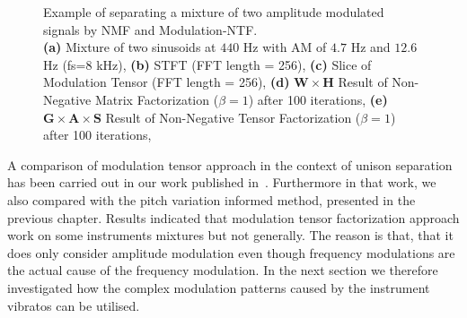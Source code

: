 \begin{figure}[H]
    \centering
    \tiny
    \hfill
    \subfloat[Spectrogram]{
    }%
    \hfill

    \subfloat[NMF]{
    }\hfill
    \hfill
    \caption{Example of separating a mixture of two amplitude modulated signals by NMF and Modulation-NTF. \\ \textbf{(a)} Mixture of two sinusoids at $440$ Hz with AM of $4.7$ Hz and $12.6$ Hz (fs=$8$ kHz), \textbf{(b)} STFT (FFT length = 256), \textbf{(c)} Slice of Modulation Tensor (FFT length = 256),  \textbf{(d)} $\mathbf{W} \times \mathbf{H}$ Result of Non-Negative Matrix Factorization ($\beta = 1$) after 100 iterations, \textbf{(e)}  $\mathbf{G} \times \mathbf{A} \times \mathbf{S} $ Result of Non-Negative Tensor Factorization ($\beta = 1$) after 100 iterations,}
    \label{fig:am_tensor}
\end{figure}

A comparison of modulation tensor approach in the context of unison separation has been carried out in our work published in~\cite{stoeter14}.
Furthermore in that work, we also compared with the pitch variation informed method, presented in the previous chapter.
Results indicated that modulation tensor factorization approach work on some instruments mixtures but not generally.
The reason is that, that it does only consider amplitude modulation even though frequency modulations are the actual cause of the frequency modulation.
In the next section we therefore investigated how the complex modulation patterns caused by the instrument vibratos can be utilised.

